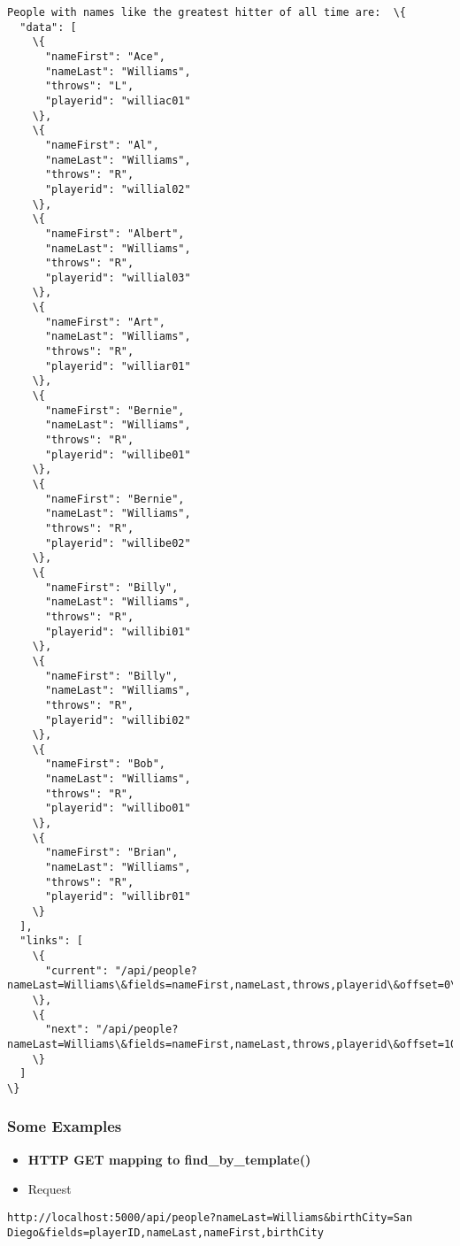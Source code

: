 \documentclass[11pt]{article}
\begin{document}
    \begin{Verbatim}[commandchars=\\\{\}]
People with names like the greatest hitter of all time are:  \{
  "data": [
    \{
      "nameFirst": "Ace",
      "nameLast": "Williams",
      "throws": "L",
      "playerid": "williac01"
    \},
    \{
      "nameFirst": "Al",
      "nameLast": "Williams",
      "throws": "R",
      "playerid": "willial02"
    \},
    \{
      "nameFirst": "Albert",
      "nameLast": "Williams",
      "throws": "R",
      "playerid": "willial03"
    \},
    \{
      "nameFirst": "Art",
      "nameLast": "Williams",
      "throws": "R",
      "playerid": "williar01"
    \},
    \{
      "nameFirst": "Bernie",
      "nameLast": "Williams",
      "throws": "R",
      "playerid": "willibe01"
    \},
    \{
      "nameFirst": "Bernie",
      "nameLast": "Williams",
      "throws": "R",
      "playerid": "willibe02"
    \},
    \{
      "nameFirst": "Billy",
      "nameLast": "Williams",
      "throws": "R",
      "playerid": "willibi01"
    \},
    \{
      "nameFirst": "Billy",
      "nameLast": "Williams",
      "throws": "R",
      "playerid": "willibi02"
    \},
    \{
      "nameFirst": "Bob",
      "nameLast": "Williams",
      "throws": "R",
      "playerid": "willibo01"
    \},
    \{
      "nameFirst": "Brian",
      "nameLast": "Williams",
      "throws": "R",
      "playerid": "willibr01"
    \}
  ],
  "links": [
    \{
      "current": "/api/people?nameLast=Williams\&fields=nameFirst,nameLast,throws,playerid\&offset=0\&limit=10"
    \},
    \{
      "next": "/api/people?nameLast=Williams\&fields=nameFirst,nameLast,throws,playerid\&offset=10\&limit=10"
    \}
  ]
\}

    \end{Verbatim}

    \subsubsection{Some Examples}\label{some-examples}

    \begin{itemize}
\item
  \textbf{HTTP GET mapping to find\_by\_template()}
\item
  Request
\end{itemize}

\begin{verbatim}
http://localhost:5000/api/people?nameLast=Williams&birthCity=San Diego&fields=playerID,nameLast,nameFirst,birthCity
\end{verbatim}
\end{document}
